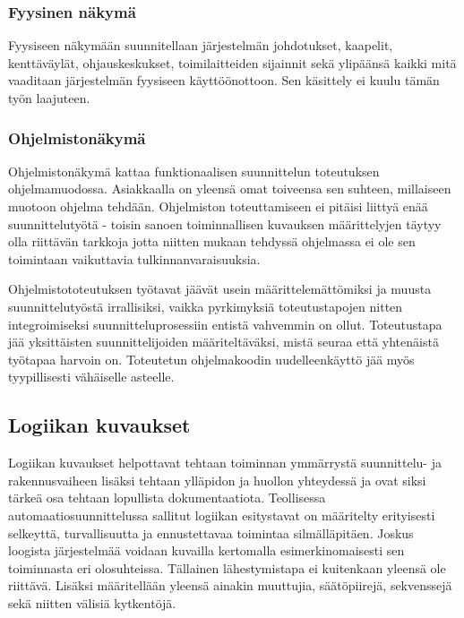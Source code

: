 \documentclass[finnish,12pt]{article}
\begin{document}
		\subsubsection{Fyysinen näkymä}

Fyysiseen näkymään suunnitellaan järjestelmän johdotukset, kaapelit, kenttäväylät,
ohjauskeskukset, toimilaitteiden sijainnit sekä ylipäänsä kaikki mitä vaaditaan 
järjestelmän fyysiseen käyttöönottoon. Sen käsittely ei kuulu tämän työn laajuteen.

		\subsubsection{Ohjelmistonäkymä}

Ohjelmistonäkymä kattaa funktionaalisen suunnittelun toteutuksen ohjelmamuodossa.
Asiakkaalla on yleensä omat toiveensa sen suhteen, millaiseen muotoon ohjelma tehdään.
Ohjelmiston toteuttamiseen ei pitäisi liittyä enää suunnittelutyötä - toisin sanoen toiminnallisen kuvauksen määrittelyjen täytyy olla riittävän tarkkoja jotta niitten mukaan tehdyssä ohjelmassa ei ole sen toimintaan vaikuttavia tulkinnanvaraisuuksia.

Ohjelmistototeutuksen työtavat jäävät usein määrittelemättömiksi ja muusta suunnittelutyöstä irrallisiksi,
vaikka pyrkimyksiä toteutustapojen nitten integroimiseksi suunnitteluprosessiin entistä vahvemmin on ollut.
Toteutustapa jää yksittäisten suunnittelijoiden määriteltäväksi, mistä seuraa että yhtenäistä työtapaa harvoin on.
Toteutetun ohjelmakoodin uudelleenkäyttö jää myös tyypillisesti vähäiselle asteelle. \cite{RefWorks:42}


	\subsection{Logiikan kuvaukset}


Logiikan kuvaukset helpottavat tehtaan toiminnan ymmärrystä suunnittelu- ja rakennusvaiheen lisäksi tehtaan ylläpidon ja huollon yhteydessä ja ovat siksi tärkeä osa tehtaan lopullista dokumentaatiota.
Teollisessa automaatiosuunnittelussa sallitut logiikan esitystavat on määritelty erityisesti selkeyttä, turvallisuutta ja ennustettavaa toimintaa silmälläpitäen.
Joskus loogista järjestelmää voidaan kuvailla kertomalla esimerkinomaisesti sen toiminnasta eri olosuhteissa.
Tällainen lähestymistapa ei kuitenkaan yleensä ole riittävä.
Lisäksi määritellään yleensä ainakin muuttujia, säätöpiirejä, sekvenssejä sekä niitten välisiä kytkentöjä.\cite{RefWorks:41}
\end{document}
